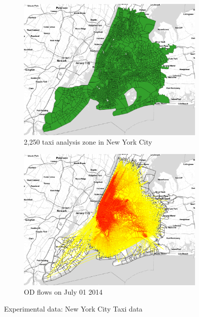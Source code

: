 \documentclass[a4paper,UKenglish]{lipics-v2016}
\begin{document}
\begin{figure}
	\centering
	\begin{subfigure}[b]{0.49\textwidth}
		\includegraphics[width=\textwidth]{images/taxizone.eps}
		\caption{2,250 taxi analysis zone in New York City}
		\label{fig:taxizone}
	\end{subfigure}
	\hfill %
	\begin{subfigure}[b]{0.49\textwidth}
		\includegraphics[width=\textwidth]{images/July1st_pic2.png}
		\caption{OD flows on July 01 2014}
		\label{fig:ODflows}
	\end{subfigure}
	\caption{Experimental data: New York City Taxi data}\label{fig:taxi_data}	
\end{figure}
\end{document}
